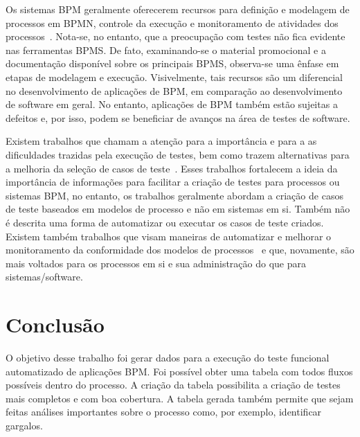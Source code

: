 \documentclass[12pt]{article}
\begin{document}
Os sistemas BPM geralmente oferecerem recursos para definição e modelagem de processos em BPMN, controle da execução e monitoramento de atividades dos processos~\cite{forrester}. Nota-se, no entanto, que a preocupação com testes não fica evidente nas ferramentas BPMS. De fato, examinando-se o material promocional e a documentação disponível sobre os principais BPMS, observa-se uma ênfase em etapas de modelagem e execução. Visivelmente, tais recursos são um diferencial no desenvolvimento de aplicações de BPM, em comparação ao desenvolvimento de software em geral. No entanto, aplicações de BPM também estão sujeitas a defeitos e, por isso, podem se beneficiar de avanços na área de testes de software.

Existem trabalhos que chamam a atenção para a importância e para a as dificuldades trazidas pela execução de testes, bem como trazem alternativas para a melhoria da seleção de casos de teste~\cite{bohmer2015genetic}. Esses trabalhos fortalecem a ideia da importância de informações para facilitar a criação de testes para processos ou sistemas BPM, no entanto, os trabalhos geralmente abordam a criação de casos de teste baseados em modelos de processo e não em sistemas em si. Também não é descrita uma forma de automatizar ou executar os casos de teste criados. Existem também trabalhos que visam maneiras de automatizar e melhorar o monitoramento da conformidade dos modelos de processos~\cite{ly2015compliance, van2012replaying} e que, novamente, são mais voltados para os processos em si e sua administração do que para sistemas/software.


\section{Conclusão}\label{sec:conclusao}

O objetivo desse trabalho foi gerar dados para a execução do teste funcional automatizado de aplicações BPM. Foi possível obter uma tabela com todos fluxos possíveis dentro do processo. A criação da tabela possibilita a criação de testes mais completos e com boa cobertura. A tabela gerada também permite que sejam feitas análises importantes sobre o processo como, por exemplo, identificar gargalos.
\end{document}
